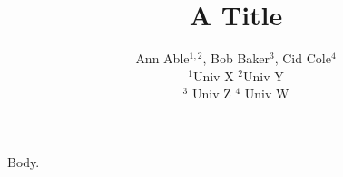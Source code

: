 \documentclass{article}
\begin{document}
\title{A Title}
\author{Ann Able$^{1,2}$, Bob Baker$^{3}$, Cid Cole$^{4}$ \\
$^1$Univ X \hfill$^2$Univ Y \\
$^3$ Univ Z \xspace$^4$ Univ W}
\maketitle
Body.
\end{document}
